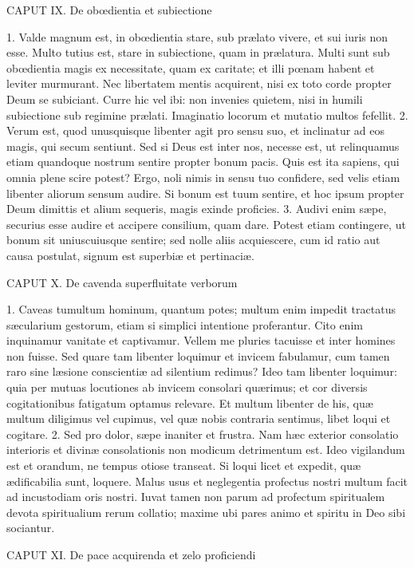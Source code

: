 \documentclass[twoside]{article}
\begin{document}
CAPUT IX.
De obœdientia et subiectione

1. Valde magnum est, in obœdientia stare, sub prælato vivere, et sui iuris non esse. Multo tutius est, stare in subiectione, quam in prælatura. Multi sunt sub obœdientia magis ex necessitate, quam ex caritate; et illi pœnam habent et leviter murmurant. Nec libertatem mentis acquirent, nisi ex toto corde propter Deum se subiciant. Curre hic vel ibi: non invenies quietem, nisi in humili subiectione sub regimine prælati. Imaginatio locorum et mutatio multos fefellit.
2. Verum est, quod unusquisque libenter agit pro sensu suo, et inclinatur ad eos magis, qui secum sentiunt. Sed si Deus est inter nos, necesse est, ut relinquamus etiam quandoque nostrum sentire propter bonum pacis. Quis est ita sapiens, qui omnia plene scire potest? Ergo, noli nimis in sensu tuo confidere, sed velis etiam libenter aliorum sensum audire. Si bonum est tuum sentire, et hoc ipsum propter Deum dimittis et alium sequeris, magis exinde proficies.
3. Audivi enim sæpe, securius esse audire et accipere consilium, quam dare. Potest etiam contingere, ut bonum sit uniuscuiusque sentire; sed nolle aliis acquiescere, cum id ratio aut causa postulat, signum est superbiæ et pertinaciæ.


CAPUT X.
De cavenda superfluitate verborum

1. Caveas tumultum hominum, quantum potes; multum enim impedit tractatus sæcularium gestorum, etiam si simplici intentione proferantur. Cito enim inquinamur vanitate et captivamur. Vellem me pluries tacuisse et inter homines non fuisse. Sed quare tam libenter loquimur et invicem fabulamur, cum tamen raro sine læsione conscientiæ ad silentium redimus? Ideo tam libenter loquimur: quia per mutuas locutiones ab invicem consolari quærimus; et cor diversis cogitationibus fatigatum optamus relevare. Et multum libenter de his, quæ multum diligimus vel cupimus, vel quæ nobis contraria sentimus, libet loqui et cogitare.
2. Sed pro dolor, sæpe inaniter et frustra. Nam hæc exterior consolatio interioris et divinæ consolationis non modicum detrimentum est. Ideo vigilandum est et orandum, ne tempus otiose transeat. Si loqui licet et expedit, quæ ædificabilia sunt, loquere. Malus usus et neglegentia profectus nostri multum facit ad incustodiam oris nostri. Iuvat tamen non parum ad profectum spiritualem devota spiritualium rerum collatio; maxime ubi pares animo et spiritu in Deo sibi sociantur.


CAPUT XI.
De pace acquirenda et zelo proficiendi
\end{document}
